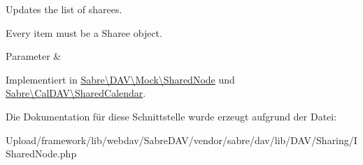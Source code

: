 Updates the list of sharees.

Every item must be a Sharee object.


\begin{DoxyParams}{Parameter}
{\em } & \\
\hline
\end{DoxyParams}


Implementiert in \mbox{\hyperlink{class_sabre_1_1_d_a_v_1_1_mock_1_1_shared_node_a4dfbf2b033295cd266b532d7fcaed18c}{Sabre\textbackslash{}\+D\+A\+V\textbackslash{}\+Mock\textbackslash{}\+Shared\+Node}} und \mbox{\hyperlink{class_sabre_1_1_cal_d_a_v_1_1_shared_calendar_a6b8b622de08517a514d91581f95f09fa}{Sabre\textbackslash{}\+Cal\+D\+A\+V\textbackslash{}\+Shared\+Calendar}}.



Die Dokumentation für diese Schnittstelle wurde erzeugt aufgrund der Datei\+:\begin{DoxyCompactItemize}
\item 
Upload/framework/lib/webdav/\+Sabre\+D\+A\+V/vendor/sabre/dav/lib/\+D\+A\+V/\+Sharing/I\+Shared\+Node.\+php\end{DoxyCompactItemize}
